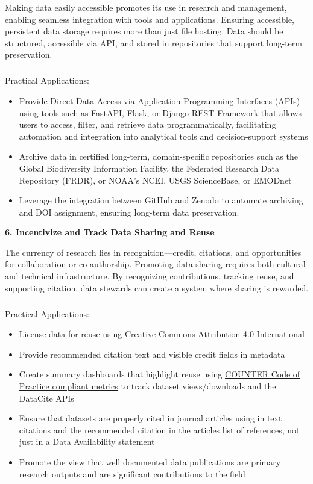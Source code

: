 \documentclass[
  letterpaper,
  DIV=11,
  numbers=noendperiod]{scrartcl}
\makeatletter
\let\oldsubparagraph\subparagraph
\renewcommand{\subparagraph}{
    \@ifstar
      \xxxSubParagraphStar
      \xxxSubParagraphNoStar
  }
\newcommand{\xxxSubParagraphStar}[1]{\oldsubparagraph*{#1}\mbox{}}
\newcommand{\xxxSubParagraphNoStar}[1]{\oldsubparagraph{#1}\mbox{}}
\makeatother
\begin{document}
Making data easily accessible promotes its use in research and
management, enabling seamless integration with tools and applications.
Ensuring accessible, persistent data storage requires more than just
file hosting. Data should be structured, accessible via API, and stored
in repositories that support long-term preservation.

\subparagraph{Practical Applications:}\label{practical-applications-4}

\begin{itemize}
\item
  Provide Direct Data Access via Application Programming Interfaces
  (APIs) using tools such as FastAPI, Flask, or Django REST Framework
  that allows users to access, filter, and retrieve data
  programmatically, facilitating automation and integration into
  analytical tools and decision-support systems
\item
  Archive data in certified long-term, domain-specific repositories such
  as the Global Biodiversity Information Facility, the Federated
  Research Data Repository (FRDR), or NOAA's NCEI, USGS ScienceBase, or
  EMODnet
\item
  Leverage the integration between GitHub and Zenodo to automate
  archiving and DOI assignment, ensuring long-term data preservation.
\end{itemize}

\textbf{6. Incentivize and Track Data Sharing and Reuse}

The currency of research lies in recognition---credit, citations, and
opportunities for collaboration or co-authorship. Promoting data sharing
requires both cultural and technical infrastructure. By recognizing
contributions, tracking reuse, and supporting citation, data stewards
can create a system where sharing is rewarded.

\subparagraph{Practical Applications:}\label{practical-applications-5}

\begin{itemize}
\item
  License data for reuse using
  \href{https://creativecommons.org/licenses/by/4.0/deed.en}{Creative
  Commons Attribution 4.0 International}
\item
  Provide recommended citation text and visible credit fields in
  metadata
\item
  Create summary dashboards that highlight reuse using
  \href{https://www.countermetrics.org/}{COUNTER Code of Practice
  compliant metrics} to track dataset views/downloads and the DataCite
  APIs
\item
  Ensure that datasets are properly cited in journal articles using in
  text citations and the recommended citation in the articles list of
  references, not just in a Data Availability statement
\item
  Promote the view that well documented data publications are primary
  research outputs and are significant contributions to the field
\end{itemize}
\end{document}
